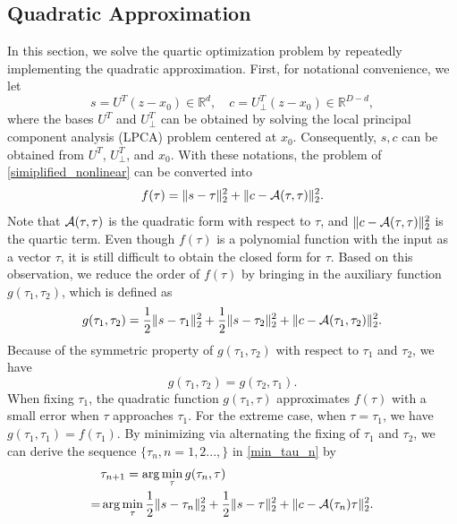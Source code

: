 \documentclass{article}
\theoremstyle{remark}
\begin{document}
\subsection{Quadratic Approximation}
In this section, we solve the quartic optimization problem by repeatedly implementing the quadratic approximation.
First, for notational convenience, we let  
\[
s = U^T (z-x_0)\in {\mathbb R}^{d}, \quad c = U^T_{\perp}(z-x_0)\in {\mathbb R}^{D-d},
\]
where the bases $U^T$ and $U^T_{\perp}$ can be obtained by solving the local principal component analysis (LPCA) problem centered at $x_0$. Consequently, $s, c$ can be obtained from $U^T$, $U^T_\perp$, and $x_0$.
With these notations, the problem of \eqref{simiplified_nonlinear} can be converted into
\begin{equation}\label{f_tau}
f(\tau) = \|s-\tau\|_2^2+\|c- {{\cal A}} (\tau,\tau)\|_2^2.
\end{equation}
Note that ${{\cal A}} (\tau,\tau)$ is the quadratic form with respect to $\tau$, and $\|c- {{\cal A}} (\tau,\tau)\|_2^2$ is the quartic term. Even though $f(\tau)$ is a polynomial function with the input as a vector $\tau$, it is still difficult to obtain the closed form for $\tau$. Based on this observation, we reduce the order of $f(\tau)$ 
by bringing in the auxiliary function $g(\tau_1,\tau_2)$, which is defined as
\[
g(\tau_1,\tau_2) =\frac{1}{2} \|s-\tau_1\|_2^2+\frac{1}{2} \|s-\tau_2\|_2^2+\|c- {\cal A} (\tau_1,\tau_2)\|_2^2.
\]
Because of the symmetric property of $g(\tau_1,\tau_2)$ with respect to $\tau_1$ and $\tau_2$, we have
\[
g(\tau_1,\tau_2) = g(\tau_2,\tau_1).
\]
When fixing $\tau_1$, the quadratic function $g(\tau_1,\tau)$ approximates $f(\tau)$ with a small error when $\tau$ approaches $ \tau_1$. For the extreme case, when $\tau=\tau_1$, we have $g(\tau_1,\tau_1)=f(\tau_1)$. By minimizing via alternating the fixing of  $\tau_1$ and $\tau_2$, we can derive the sequence $\{\tau_n, n=1,2...,\}$ in \eqref{min_tau_n} by
\begin{equation}\label{min_tau_n}
\begin{aligned}
&\tau_{n+1} = \arg\min_{\tau} g(\tau_{n},\tau)  \\
=&\arg\min_{\tau}\frac{1}{2}\|s-\tau_{n}\|_2^2+\frac{1}{2}\|s-\tau\|_2^2+\|c-{\cal A}(\tau_{n})\tau\|_2^2.
\end{aligned}
\end{equation}
\end{document}
